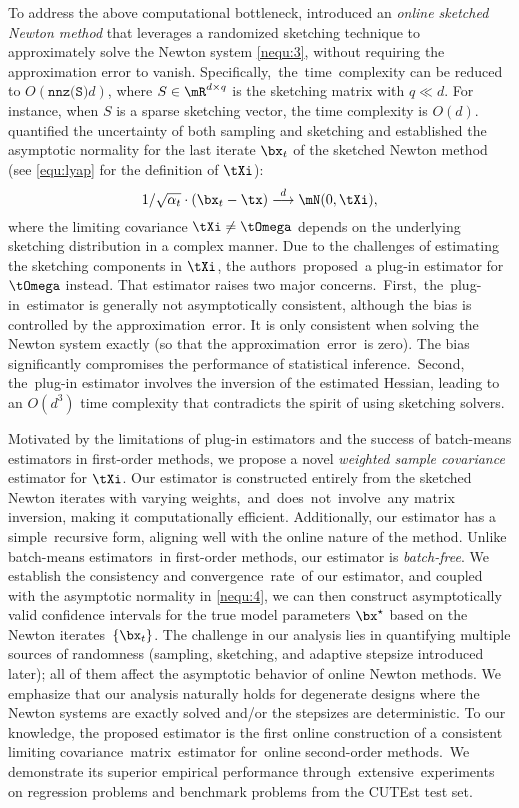 To address the above computational bottleneck, \cite{Na2022Statistical} introduced an \textit{online sketched Newton method} that leverages a randomized sketching technique to approximately solve the Newton system \eqref{nequ:3}, without requiring the approximation error to vanish. Specifically,~the~time~complexity can be reduced to $O(\texttt{nnz(S)}d)$, where $S\in\mR^{d\times q}$ is the sketching matrix with $q\ll d$. For instance, when $S$ is a sparse sketching vector, the time complexity is $O(d)$. \cite{Na2022Statistical} quantified the uncertainty of both sampling and sketching and established the asymptotic normality for the last iterate $\bx_t$ of the sketched Newton method (see \eqref{equ:lyap} for the definition of $\tXi$):
\begin{equation}\label{nequ:4}
1/\sqrt{\alpha_t}\cdot(\bx_t-\tx)\stackrel{d}{\longrightarrow}\mN(0, \tXi),
\end{equation}
where the limiting covariance $\tXi\neq \tOmega$ depends on the underlying sketching distribution in a complex manner. Due to the challenges of estimating the sketching components in $\tXi$, the authors~proposed~a plug-in estimator for $\tOmega$ instead. That estimator raises two major concerns.~First,~the~\mbox{plug-in}~estimator is generally not asymptotically consistent, although the bias is controlled by the \mbox{approximation}~error. It is only consistent when solving the Newton system exactly (so that the approximation~error~is zero). The bias significantly compromises the performance of statistical inference.~Second, the~plug-in estimator involves the inversion of the estimated Hessian, leading to an $O(d^3)$ time complexity that contradicts the spirit of using sketching solvers.


Motivated by the limitations of plug-in estimators and the success of batch-means estimators in first-order methods, we propose a novel \textit{weighted sample covariance} estimator for $\tXi$.
Our estimator is constructed entirely from the sketched Newton iterates with varying weights,~and~does~not~\mbox{involve}~any matrix inversion, making it computationally efficient. Additionally, our estimator has a simple~recursive form, aligning well with the online nature of the method. Unlike batch-means estimators~in first-order methods, our estimator is \textit{batch-free}.
We establish the consistency and convergence~rate~of our estimator, and coupled with the asymptotic normality in \eqref{nequ:4}, we can then construct asymptotically valid confidence intervals for the true model parameters $\bx^{\star}$ based on the Newton iterates~$\{\bx_t\}$.
The challenge in our analysis lies in quantifying multiple sources of randomness (sampling, sketching, and adaptive stepsize introduced later); all of them affect the asymptotic behavior of online Newton methods. 
We emphasize that our analysis naturally holds for degenerate designs where the Newton systems are exactly solved and/or the stepsizes are deterministic. To our knowledge, the proposed estimator is the first online construction of a consistent limiting covariance~\mbox{matrix}~estimator for~online second-order methods.~We demonstrate its superior empirical performance through~extensive~experiments on regression problems and benchmark problems from the CUTEst test set.


